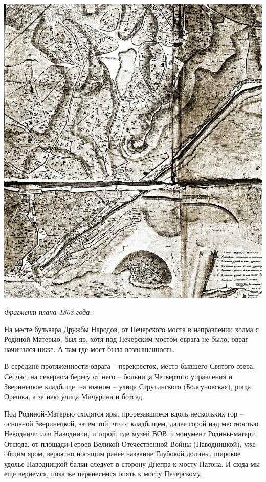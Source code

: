 \begin{center}
\includegraphics[width=\linewidth]{chast-vosp/zver/1803-map.jpg}

\textit{Фрагмент плана 1803 года.}
\end{center}


На месте бульвара Дружбы Народов, от Печерского моста в направлении холма с Родиной-Матерью, был яр, хотя под Печерским мостом оврага не было, овраг начинался ниже. А там где мост была возвышенность.

В середине протяженности оврага – перекресток, место бывшего Святого озера. Сейчас, на северном берегу от него – больница Четвертого управления и Зверинецкое кладбище, на южном – улица Струтинского (Болсуновская), роща Орешка, а за нею улица Мичурина и ботсад.

Под Родиной-Матерью сходятся яры, прорезавшиеся вдоль нескольких гор – основной Зверинецкой, затем той, что с кладбищем, далее горой над местностью Неводничи или Наводничи, и горой, где музей ВОВ и монумент Родины-матери. Отсюда, от площади Героев Великой Отечественной Войны (Наводницкой), уже общим яром, вероятно носящим ранее название Глубокой долины, широкое удолье Наводницкой балки следует в сторону Днепра к мосту Патона. И сюда мы еще вернемся, пока же перенесемся опять к мосту Печерскому.

